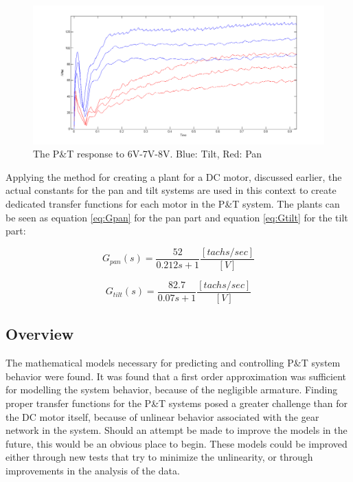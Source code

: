 \begin{figure}[h!]
\centering
\includegraphics[scale=0.35]{Billeder/PTStepResponseGraph.png}
\caption{The P\&T response to 6V-7V-8V. Blue: Tilt, Red: Pan}
\label{fig:PTStepResponseGraph}
\end{figure}

Applying the method for creating a plant for a DC motor, discussed earlier, the actual constants for the pan and tilt systems are used in this context to create dedicated transfer functions for each motor in the P\&T system. The plants can be seen as equation \ref{eq:Gpan} for the pan part and equation \ref{eq:Gtilt} for the tilt part:

\begin{equation}
G_{pan} (s) = \frac{52}{0.212s+1}\frac{[tachs/sec]}{[V]}
\label{eq:Gpan}
\end{equation}

\begin{equation}
G_{tilt} (s) = \frac{82.7}{0.07s+1}\frac{[tachs/sec]}{[V]}
\label{eq:Gtilt}
\end{equation}

\subsection{Overview}
The mathematical models necessary for predicting and controlling P\&T system behavior were found. It was found that a first order approximation was sufficient for modelling the system behavior, because of the negligible armature. Finding proper transfer functions for the P\&T systems posed a greater challenge than for the DC motor itself, because of unlinear behavior associated with the gear network in the system. Should an attempt be made to improve the models in the future, this would be an obvious place to begin. These models could be improved either through new tests that try to minimize the unlinearity, or through improvements in the analysis of the data.